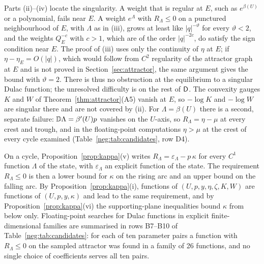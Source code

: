 Parts (ii)--(iv) locate the singularity. A weight that is regular at $E$, such as $e^{\beta(U)}$ or a polynomial, fails near $E$. A weight $e^\Lambda$ with $R_\Lambda\le0$ on a punctured neighbourhood of $E$, with $\Lambda$ as in (iii), grows at least like $|q|^{-\vartheta}$ for every $\vartheta<2$, and the weights $Q_E^{-c}$ with $c>1$, which are of the order $|q|^{-2c}$, do satisfy the sign condition near $E$. The proof of (iii) uses only the continuity of $\eta$ at $E$; if $\eta-\eta_E=O(|q|)$, which would follow from $C^2$ regularity of the attractor graph at $E$ and is not proved in Section~\ref{sec:attractor}, the same argument gives the bound with $\vartheta=2$. There is thus no obstruction at the equilibrium to a singular Dulac function; the unresolved difficulty is on the rest of $\mathsf D$. The convexity gauges $K$ and $W$ of Theorem~\ref{thm:attractor}(A5) vanish at $E$, so $-\log K$ and $-\log W$ are singular there and are not covered by (ii). For $\Lambda=\beta(U)$ there is a second, separate failure: $\mathbb D\Lambda=\beta'(U)p$ vanishes on the $U$-axis, so $R_\Lambda=\eta-\mu$ at every crest and trough, and in the floating-point computations $\eta>\mu$ at the crest of every cycle examined (Table~\ref{neg:tab:candidates}, row D4).

On a cycle, Proposition~\ref{prop:kappa}(v) writes $R_\Lambda=\varepsilon_\Lambda-p\,\kappa$ for every $C^1$ function $\Lambda$ of the state, with $\varepsilon_\Lambda$ an explicit function of the state. The requirement $R_\Lambda\le0$ is then a lower bound for $\kappa$ on the rising arc and an upper bound on the falling arc. By Proposition~\ref{prop:kappa}(i), functions of $(U,p,y,\eta,\zeta,K,W)$ are functions of $(U,p,y,\kappa)$ and lead to the same requirement, and by Proposition~\ref{prop:kappa}(vi) the supporting-plane inequalities bound $\kappa$ from below only. Floating-point searches for Dulac functions in explicit finite-dimensional families are summarised in rows B7--B10 of Table~\ref{neg:tab:candidates}: for each of ten parameter pairs a function with $R_\Lambda\le0$ on the sampled attractor was found in a family of 26 functions, and no single choice of coefficients serves all ten pairs.


